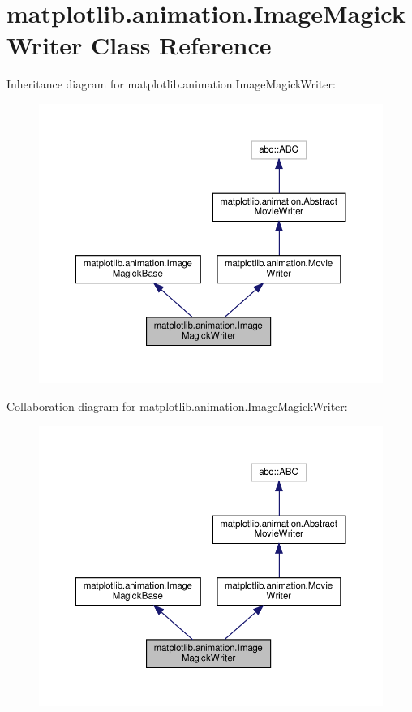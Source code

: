 \hypertarget{classmatplotlib_1_1animation_1_1ImageMagickWriter}{}\section{matplotlib.\+animation.\+Image\+Magick\+Writer Class Reference}
\label{classmatplotlib_1_1animation_1_1ImageMagickWriter}


Inheritance diagram for matplotlib.\+animation.\+Image\+Magick\+Writer\+:
\nopagebreak
\begin{figure}[H]
\begin{center}
\leavevmode
\includegraphics[width=350pt]{classmatplotlib_1_1animation_1_1ImageMagickWriter__inherit__graph}
\end{center}
\end{figure}


Collaboration diagram for matplotlib.\+animation.\+Image\+Magick\+Writer\+:
\nopagebreak
\begin{figure}[H]
\begin{center}
\leavevmode
\includegraphics[width=350pt]{classmatplotlib_1_1animation_1_1ImageMagickWriter__coll__graph}
\end{center}
\end{figure}
